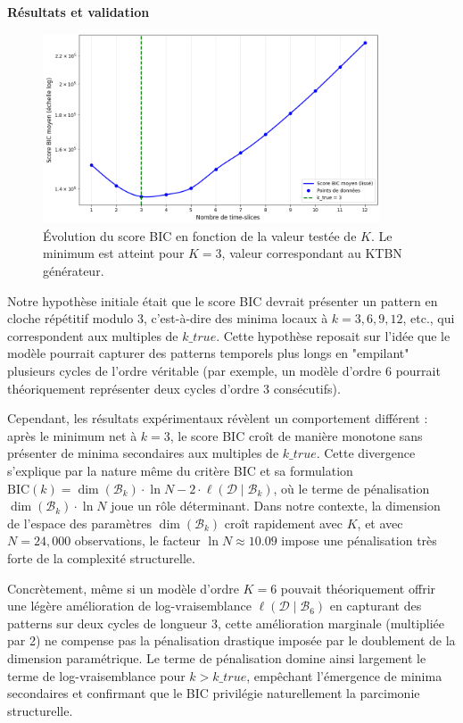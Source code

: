\documentclass{article}
\begin{document}
\textbf{Résultats et validation}

\begin{figure}[ht]
    \centering
    \includegraphics[width=10cm]{img/BIC.png}
    \caption{Évolution du score BIC en fonction de la valeur testée de $K$. Le
        minimum est atteint pour $K=3$, valeur correspondant au KTBN générateur.}
    \label{fig:bic}
\end{figure}

Notre hypothèse initiale était que le score BIC devrait présenter un pattern en cloche répétitif modulo 3,
c'est-à-dire des minima locaux à $k = 3, 6, 9, 12$, etc., qui correspondent aux multiples de $k\_true$.
Cette hypothèse reposait sur l'idée que le modèle pourrait capturer des patterns temporels plus longs en
"empilant" plusieurs cycles de l'ordre véritable (par exemple, un modèle d'ordre 6 pourrait théoriquement
représenter deux cycles d'ordre 3 consécutifs).

Cependant, les résultats expérimentaux révèlent un comportement différent : après le minimum net à $k = 3$,
le score BIC croît de manière monotone sans présenter de minima secondaires aux multiples de $k\_true$. Cette
divergence s'explique par la nature même du critère BIC et sa formulation $\mathrm{BIC}(k)
    = \dim(\mathcal{B}_k) \cdot \ln N - 2 \cdot \ell(\mathcal{D} \mid \mathcal{B}_k)$, où le terme de pénalisation
$\dim(\mathcal{B}_k) \cdot \ln N$ joue un rôle déterminant. Dans notre contexte, la dimension de l'espace des
paramètres $\dim(\mathcal{B}_k)$ croît rapidement avec $K$, et avec $N = 24,000$ observations, le facteur
$\ln N \approx 10.09$ impose une pénalisation très forte de la complexité structurelle.

Concrètement, même si un modèle d'ordre $K = 6$ pouvait théoriquement offrir une légère amélioration de log-vraisemblance
$\ell(\mathcal{D} \mid \mathcal{B}_6)$ en capturant des patterns sur deux cycles de longueur 3, cette amélioration
marginale (multipliée par 2) ne compense pas la pénalisation drastique imposée par le doublement de la dimension
paramétrique. Le terme de pénalisation domine ainsi largement le terme de log-vraisemblance pour $k > k\_true$, empêchant
l'émergence de minima secondaires et confirmant que le BIC privilégie naturellement la parcimonie structurelle.
\end{document}
